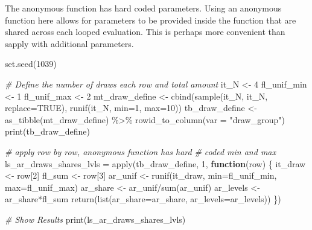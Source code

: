 \documentclass[
]{book}
\newenvironment{Shaded}{\begin{snugshade}}{\end{snugshade}}
\newcommand{\AttributeTok}[1]{\textcolor[rgb]{0.77,0.63,0.00}{#1}}
\newcommand{\CommentTok}[1]{\textcolor[rgb]{0.56,0.35,0.01}{\textit{#1}}}
\newcommand{\ConstantTok}[1]{\textcolor[rgb]{0.00,0.00,0.00}{#1}}
\newcommand{\ControlFlowTok}[1]{\textcolor[rgb]{0.13,0.29,0.53}{\textbf{#1}}}
\newcommand{\DecValTok}[1]{\textcolor[rgb]{0.00,0.00,0.81}{#1}}
\newcommand{\FunctionTok}[1]{\textcolor[rgb]{0.00,0.00,0.00}{#1}}
\newcommand{\NormalTok}[1]{#1}
\newcommand{\OtherTok}[1]{\textcolor[rgb]{0.56,0.35,0.01}{#1}}
\newcommand{\SpecialCharTok}[1]{\textcolor[rgb]{0.00,0.00,0.00}{#1}}
\newcommand{\StringTok}[1]{\textcolor[rgb]{0.31,0.60,0.02}{#1}}
\begin{document}
The anonymous function has hard coded parameters. Using an anonymous function here allows for parameters to be provided inside the function that are shared across each looped evaluation. This is perhaps more convenient than sapply with additional parameters.

\begin{Shaded}
\begin{Highlighting}[]
\FunctionTok{set.seed}\NormalTok{(}\DecValTok{1039}\NormalTok{)}

\CommentTok{\# Define the number of draws each row and total amount}
\NormalTok{it\_N }\OtherTok{\textless{}{-}} \DecValTok{4}
\NormalTok{fl\_unif\_min }\OtherTok{\textless{}{-}} \DecValTok{1}
\NormalTok{fl\_unif\_max }\OtherTok{\textless{}{-}} \DecValTok{2}
\NormalTok{mt\_draw\_define }\OtherTok{\textless{}{-}} \FunctionTok{cbind}\NormalTok{(}\FunctionTok{sample}\NormalTok{(it\_N, it\_N, }\AttributeTok{replace=}\ConstantTok{TRUE}\NormalTok{),}
                        \FunctionTok{runif}\NormalTok{(it\_N, }\AttributeTok{min=}\DecValTok{1}\NormalTok{, }\AttributeTok{max=}\DecValTok{10}\NormalTok{))}
\NormalTok{tb\_draw\_define }\OtherTok{\textless{}{-}} \FunctionTok{as\_tibble}\NormalTok{(mt\_draw\_define) }\SpecialCharTok{\%\textgreater{}\%}
  \FunctionTok{rowid\_to\_column}\NormalTok{(}\AttributeTok{var =} \StringTok{"draw\_group"}\NormalTok{)}
\FunctionTok{print}\NormalTok{(tb\_draw\_define)}

\CommentTok{\# apply row by row, anonymous function has hard}
\CommentTok{\# coded min and max}
\NormalTok{ls\_ar\_draws\_shares\_lvls }\OtherTok{=}
  \FunctionTok{apply}\NormalTok{(tb\_draw\_define,}
        \DecValTok{1}\NormalTok{,}
        \ControlFlowTok{function}\NormalTok{(row) \{}
\NormalTok{          it\_draw }\OtherTok{\textless{}{-}}\NormalTok{ row[}\DecValTok{2}\NormalTok{]}
\NormalTok{          fl\_sum }\OtherTok{\textless{}{-}}\NormalTok{ row[}\DecValTok{3}\NormalTok{]}
\NormalTok{          ar\_unif }\OtherTok{\textless{}{-}} \FunctionTok{runif}\NormalTok{(it\_draw,}
                           \AttributeTok{min=}\NormalTok{fl\_unif\_min,}
                           \AttributeTok{max=}\NormalTok{fl\_unif\_max)}
\NormalTok{          ar\_share }\OtherTok{\textless{}{-}}\NormalTok{ ar\_unif}\SpecialCharTok{/}\FunctionTok{sum}\NormalTok{(ar\_unif)}
\NormalTok{          ar\_levels }\OtherTok{\textless{}{-}}\NormalTok{ ar\_share}\SpecialCharTok{*}\NormalTok{fl\_sum}
          \FunctionTok{return}\NormalTok{(}\FunctionTok{list}\NormalTok{(}\AttributeTok{ar\_share=}\NormalTok{ar\_share,}
                      \AttributeTok{ar\_levels=}\NormalTok{ar\_levels))}
\NormalTok{        \})}

\CommentTok{\# Show Results}
\FunctionTok{print}\NormalTok{(ls\_ar\_draws\_shares\_lvls)}
\end{Highlighting}
\end{Shaded}
\end{document}

